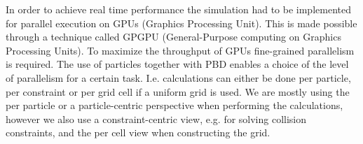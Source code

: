 In order to achieve real time performance the simulation had to be implemented
for parallel execution on GPUs (Graphics Processing Unit). This is made
possible through a technique called GPGPU (General-Purpose computing on
Graphics Processing Units). To maximize the throughput of GPUs fine-grained
parallelism is required. The use of particles together with PBD enables a
choice of the level of parallelism for a certain task. I.e. calculations can
either be done per particle, per constraint or per grid cell if a uniform grid
is used. We are mostly using the per particle or a particle-centric perspective
when performing the calculations, however we also use a constraint-centric
view, e.g. for solving collision constraints, and the per cell view when
constructing the grid.
